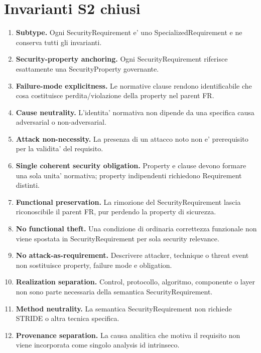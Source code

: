 \documentclass[11pt,a4paper]{article}
\begin{document}
\section{Invarianti S2 chiusi}

\begin{enumerate}[label=\textbf{S2-CLOSED-\arabic*.},leftmargin=*,align=left,labelsep=0.6em]
  \item \textbf{Subtype.} Ogni SecurityRequirement e' uno SpecializedRequirement e ne conserva tutti gli invarianti.
  \item \textbf{Security-property anchoring.} Ogni SecurityRequirement riferisce esattamente una SecurityProperty governante.
  \item \textbf{Failure-mode explicitness.} Le normative clause rendono identificabile che cosa costituisce perdita/violazione della property nel parent FR.
  \item \textbf{Cause neutrality.} L'identita' normativa non dipende da una specifica causa adversarial o non-adversarial.
  \item \textbf{Attack non-necessity.} La presenza di un attacco noto non e' prerequisito per la validita' del requisito.
  \item \textbf{Single coherent security obligation.} Property e clause devono formare una sola unita' normativa; property indipendenti richiedono Requirement distinti.
  \item \textbf{Functional preservation.} La rimozione del SecurityRequirement lascia riconoscibile il parent FR, pur perdendo la property di sicurezza.
  \item \textbf{No functional theft.} Una condizione di ordinaria correttezza funzionale non viene spostata in SecurityRequirement per sola security relevance.
  \item \textbf{No attack-as-requirement.} Descrivere attacker, technique o threat event non sostituisce property, failure mode e obligation.
  \item \textbf{Realization separation.} Control, protocollo, algoritmo, componente o layer non sono parte necessaria della semantica SecurityRequirement.
  \item \textbf{Method neutrality.} La semantica SecurityRequirement non richiede STRIDE o altra tecnica specifica.
  \item \textbf{Provenance separation.} La causa analitica che motiva il requisito non viene incorporata come singolo analysis id intrinseco.
\end{enumerate}
\end{document}
